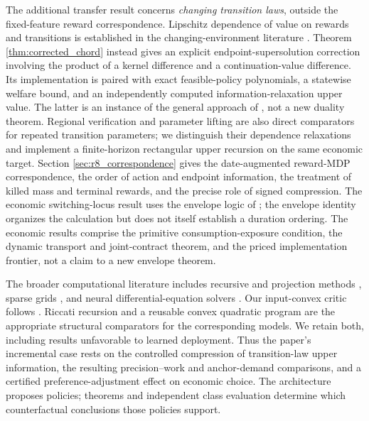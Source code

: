 The additional transfer result concerns \emph{changing transition laws}, outside the fixed-feature reward correspondence. Lipschitz dependence of value on rewards and transitions is established in the changing-environment literature \citep{csaji2008}. Theorem \ref{thm:corrected_chord} instead gives an explicit endpoint-supersolution correction involving the product of a kernel difference and a continuation-value difference. Its implementation is paired with exact feasible-policy polynomials, a statewise welfare bound, and an independently computed information-relaxation upper value. The latter is an instance of the general approach of \citet{brown2010}, not a new duality theorem. Regional verification and parameter lifting \citep{quatmann2016,heck2025} are also direct comparators for repeated transition parameters; we distinguish their dependence relaxations and implement a finite-horizon rectangular upper recursion on the same economic target. Section \ref{sec:r8_correspondence} gives the date-augmented reward-MDP correspondence, the order of action and endpoint information, the treatment of killed mass and terminal rewards, and the precise role of signed compression. The economic switching-locus result uses the envelope logic of \citet{milgrom2002}; the envelope identity organizes the calculation but does not itself establish a duration ordering. The economic results comprise the primitive consumption-exposure condition, the dynamic transport and joint-contract theorem, and the priced implementation frontier, not a claim to a new envelope theorem.

The broader computational literature includes recursive and projection methods \citep{stokey1989,judd1998}, sparse grids \citep{brumm2017}, and neural differential-equation solvers \citep{raissi2019,han2018}. Our input-convex critic follows \citet{amos2017}. Riccati recursion and a reusable convex quadratic program are the appropriate structural comparators for the corresponding models. We retain both, including results unfavorable to learned deployment. Thus the paper's incremental case rests on the controlled compression of transition-law upper information, the resulting precision--work and anchor-demand comparisons, and a certified preference-adjustment effect on economic choice. The architecture proposes policies; theorems and independent class evaluation determine which counterfactual conclusions those policies support.

